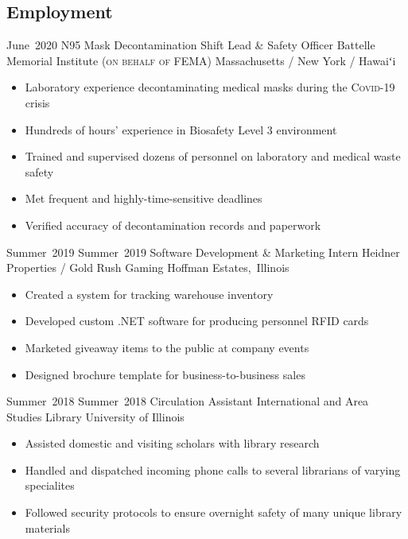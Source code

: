 \subsection*{Employment}
\secitemexperience
	{June~2020}
	{}
	{N95 Mask Decontamination Shift Lead \& Safety Officer}
	{Battelle Memorial Institute {\scshape\footnotesize (on behalf of FEMA)}}
	{Massachusetts / New York / Hawaiʻi}
	{
		\begin{itemize}
			\vspace{-2mm}
			\item Laboratory experience decontaminating medical masks during the {\scshape Covid-19} crisis
			\item Hundreds of hours' experience in Biosafety Level 3 environment
			\item Trained and supervised dozens of personnel on laboratory and medical waste safety
			\item Met frequent and highly-time-sensitive deadlines
			\item Verified accuracy of decontamination records and paperwork
			\vspace{-2mm}
		\end{itemize}
	}
\secitemexperience
	{Summer~2019}
	{Summer~2019}
	{Software Development \& Marketing Intern}
	{Heidner Properties / Gold Rush Gaming}
	{Hoffman Estates,~Illinois}
	{
		\begin{itemize}
			\vspace{-2mm}
			\item Created a system for tracking warehouse inventory
			\item Developed custom .NET software for producing personnel RFID cards
			\item Marketed giveaway items to the public at company events
			\item Designed brochure template for business-to-business sales
			\vspace{-2mm}
		\end{itemize}
	}
\secitemexperience
	{Summer~2018}
	{Summer~2018}
	{Circulation Assistant}
	{International and Area Studies Library}
	{University of Illinois}
	{
		\begin{itemize}
			\vspace{-2mm}
			\item Assisted domestic and visiting scholars with library research
			\item Handled and dispatched incoming phone calls to several librarians of varying specialites
			\item Followed security protocols to ensure overnight safety of many unique library materials 
			\vspace{-2mm}
		\end{itemize}
	}
